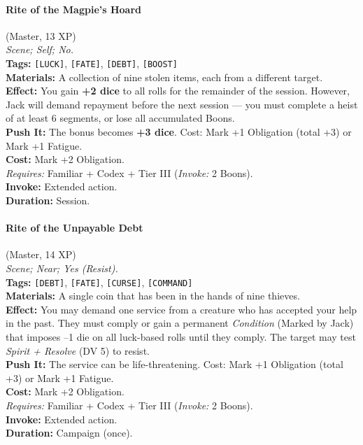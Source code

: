 \paragraph{Rite of the Magpie's Hoard} (Master, 13 XP) \hfill \\
\emph{Scene; Self; No.} \\
\textbf{Tags:} \texttt{[LUCK]}, \texttt{[FATE]}, \texttt{[DEBT]}, \texttt{[BOOST]} \\
\textbf{Materials:} A collection of nine stolen items, each from a different target. \\
\textbf{Effect:} You gain \textbf{+2 dice} to all rolls for the remainder of the session. However, Jack will demand repayment before the next session --- you must complete a heist of at least 6 segments, or lose all accumulated Boons. \\
\textbf{Push It:} The bonus becomes \textbf{+3 dice}. Cost: Mark +1 Obligation (total +3) or Mark +1 Fatigue. \\
\textbf{Cost:} Mark +2 Obligation. \\
\textit{Requires:} Familiar + Codex + Tier III (\textit{Invoke:} 2 Boons). \\
\textbf{Invoke:} Extended action. \\
\textbf{Duration:} Session.

\paragraph{Rite of the Unpayable Debt} (Master, 14 XP) \hfill \\
\emph{Scene; Near; Yes (Resist).} \\
\textbf{Tags:} \texttt{[DEBT]}, \texttt{[FATE]}, \texttt{[CURSE]}, \texttt{[COMMAND]} \\
\textbf{Materials:} A single coin that has been in the hands of nine thieves. \\
\textbf{Effect:} You may demand one service from a creature who has accepted your help in the past. They must comply or gain a permanent \textit{Condition} (Marked by Jack) that imposes --1 die on all luck-based rolls until they comply. The target may test \textit{Spirit + Resolve} (DV 5) to resist. \\
\textbf{Push It:} The service can be life-threatening. Cost: Mark +1 Obligation (total +3) or Mark +1 Fatigue. \\
\textbf{Cost:} Mark +2 Obligation. \\
\textit{Requires:} Familiar + Codex + Tier III (\textit{Invoke:} 2 Boons). \\
\textbf{Invoke:} Extended action. \\
\textbf{Duration:} Campaign (once).

